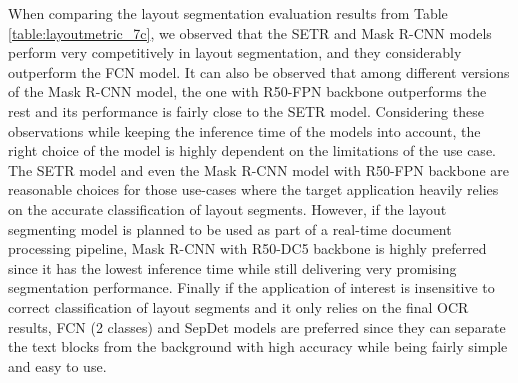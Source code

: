 \documentclass[letterpaper]{article} %
\begin{document}


When comparing the layout segmentation evaluation results from Table \ref{table:layoutmetric_7c}, we observed that the SETR and Mask R-CNN models perform very competitively in layout segmentation, and they considerably outperform the FCN model. It can also be observed that among different versions of the Mask R-CNN model, the one with R50-FPN backbone outperforms the rest and its performance is fairly close to the SETR model. Considering these observations while keeping the inference time of the models into account, the right choice of the model is highly dependent on the limitations of the use case. The SETR model and even the Mask R-CNN model with R50-FPN backbone are reasonable choices for those use-cases where the target application heavily relies on the accurate classification of layout segments. However, if the layout segmenting model is planned to be used as part of a real-time document processing pipeline, Mask R-CNN with R50-DC5 backbone is highly preferred since it has the lowest inference time while still delivering very promising segmentation performance. Finally if the application of interest is insensitive to correct classification of layout segments and it only relies on the final OCR results, FCN (2 classes) and SepDet models are preferred since they can separate the text blocks from the background with high accuracy while being fairly simple and easy to use.
\end{document}
